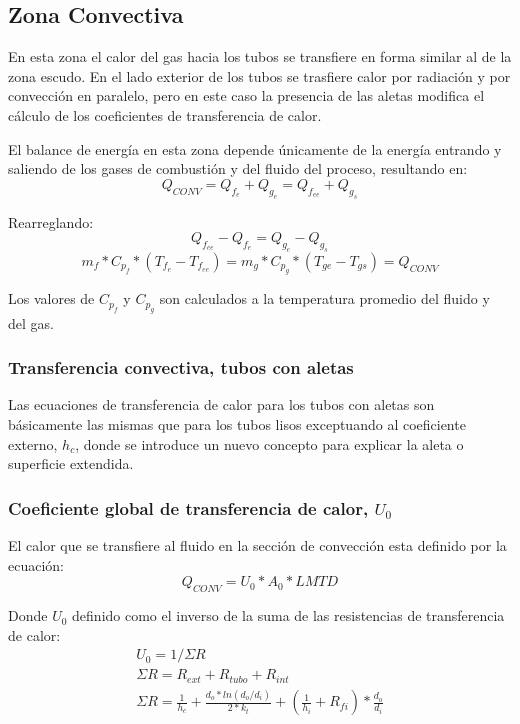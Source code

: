 \subsection{Zona Convectiva}
\par En esta zona el calor del gas hacia los tubos se transfiere en forma similar al de la zona escudo. En el lado exterior de los tubos se trasfiere calor por radiación y por convección en paralelo, pero en este caso la presencia de las aletas modifica el cálculo de los coeficientes de transferencia de calor.
\par El balance de energía en esta zona depende únicamente de la energía entrando y saliendo de los gases de combustión y del fluido del proceso, resultando en:
\begin{equation}
\label{eq:conv}
Q_{CONV} = Q_{f_e} + Q_{g_e} = Q_{f_{ee}} + Q_{g_s}
\end{equation}
\par Rearreglando:
\begin{equation}
Q_{f_{ee}} - Q_{f_e} = Q_{g_e} - Q_{g_s}
\end{equation}
\begin{equation}
\label{eq:qconv}
m_{f} *C_{p_f} *(T_{f_e} - T_{f_{ee}}) = 
m_{g} *C_{p_g} *(T_{ge}  - T_{gs}) = Q_{CONV}
\end{equation}
\par Los valores de $C_{p_f}$ y $C_{p_g}$ son calculados a la temperatura promedio del fluido y del gas.

\subsubsection{Transferencia convectiva, tubos con aletas}
\par Las ecuaciones de transferencia de calor para los tubos con aletas son básicamente las mismas que para los tubos lisos exceptuando al coeficiente externo, $h_c$, donde se introduce un nuevo concepto para explicar la aleta o superficie extendida.

\subsubsection{Coeficiente global de transferencia de calor, $U_0$}
\par El calor que se transfiere al fluido en la sección de convección esta definido por la ecuación:
\begin{equation}
Q_{CONV} = U_0 *A_0 *LMTD
\end{equation}
\par Donde $U_0$ definido como el inverso de la suma de las resistencias de transferencia de calor:
\begin{gather}
\label{}
U_0  = 1 / \Sigma R \\
\Sigma R = R_{ext} + R_{tubo} + R_{int} \\
\Sigma R =  \frac{1}{h_{c}} 
            +\frac{d_o*ln(d_o/d_i)}{2*k_t} 
            +(\frac{1}{h_i}+R_{fi})*\frac{d_o}{d_i} 
\end{gather}

